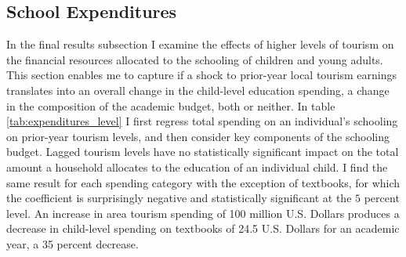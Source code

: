 \documentclass[12pt]{article}
\renewcommand\footnotesize{\fontsize{11}{13}\selectfont}
\begin{document}
	
	
	





	\FloatBarrier

	\subsection{School Expenditures}
	\label{subsec:expenditures}

	In the final results subsection I examine the effects of higher levels of tourism on the financial resources allocated to the schooling of children and young adults. This section enables me to capture if a shock to prior-year local tourism earnings translates into an overall change in the child-level education spending, a change in the composition of the academic budget, both or neither. In table \ref{tab:expenditures_level} I first regress total spending on an individual's schooling on prior-year tourism levels, and then consider key components of the schooling budget. Lagged tourism levels have no statistically significant impact on the total amount a household allocates to the education of an individual child. I find the same result for each spending category with the exception of textbooks, for which the coefficient is surprisingly negative and statistically significant at the $5$ percent level. An increase in area tourism spending of 100 million U.S. Dollars produces a decrease in child-level spending on textbooks of 24.5 U.S. Dollars for an academic year, a 35 percent decrease. 
	
\end{document}
